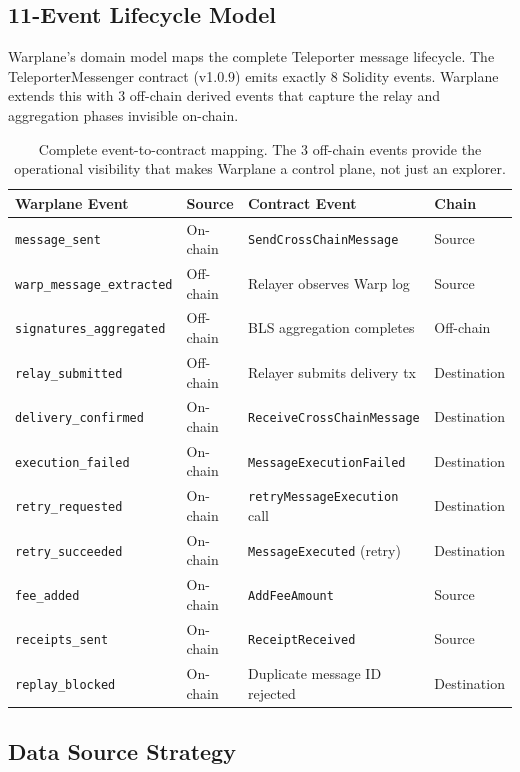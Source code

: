 \documentclass[11pt,a4paper]{article}
\begin{document}
\subsection{11-Event Lifecycle Model}

Warplane's domain model maps the complete Teleporter message lifecycle. The TeleporterMessenger contract (v1.0.9) emits exactly 8 Solidity events. Warplane extends this with 3 off-chain derived events that capture the relay and aggregation phases invisible on-chain.

\begin{table}[h]
\centering
\small
\begin{tabularx}{\textwidth}{@{}l C{1.5cm} L{5cm} l@{}}
\toprule
\textbf{Warplane Event} & \textbf{Source} & \textbf{Contract Event} & \textbf{Chain} \\
\midrule
\texttt{message\_sent} & On-chain & \texttt{SendCrossChainMessage} & Source \\
\texttt{warp\_message\_extracted} & Off-chain & Relayer observes Warp log & Source \\
\texttt{signatures\_aggregated} & Off-chain & BLS aggregation completes & Off-chain \\
\texttt{relay\_submitted} & Off-chain & Relayer submits delivery tx & Destination \\
\texttt{delivery\_confirmed} & On-chain & \texttt{ReceiveCrossChainMessage} & Destination \\
\texttt{execution\_failed} & On-chain & \texttt{MessageExecutionFailed} & Destination \\
\texttt{retry\_requested} & On-chain & \texttt{retryMessageExecution} call & Destination \\
\texttt{retry\_succeeded} & On-chain & \texttt{MessageExecuted} (retry) & Destination \\
\texttt{fee\_added} & On-chain & \texttt{AddFeeAmount} & Source \\
\texttt{receipts\_sent} & On-chain & \texttt{ReceiptReceived} & Source \\
\texttt{replay\_blocked} & On-chain & Duplicate message ID rejected & Destination \\
\bottomrule
\end{tabularx}
\caption{Complete event-to-contract mapping. The 3 off-chain events provide the operational visibility that makes Warplane a control plane, not just an explorer.}
\end{table}

\subsection{Data Source Strategy}
\end{document}
